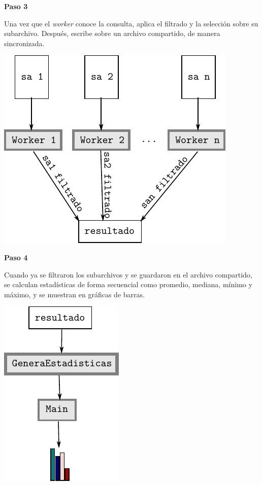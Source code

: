 \documentclass{beamer}
\begin{document}
\begin{frame}

\textbf{Paso 3}

Una vez que el \textit{worker} conoce la consulta, aplica el filtrado y la selección sobre su subarchivo. Después, escribe sobre un archivo compartido, de manera sincronizada.

\begin{center}
\includegraphics[scale=0.6]{filtrado}
\end{center}

\end{frame}

\begin{frame}

\textbf{Paso 4}

Cuando ya se filtraron los subarchivos y se guardaron en el archivo compartido, se calculan estadísticas de forma secuencial como promedio, mediana, mínimo y máximo, y se muestran en gráficas de barras.

\begin{center}
\includegraphics[scale=0.6]{estadisticas}
\end{center}

\end{frame}
\end{document}
